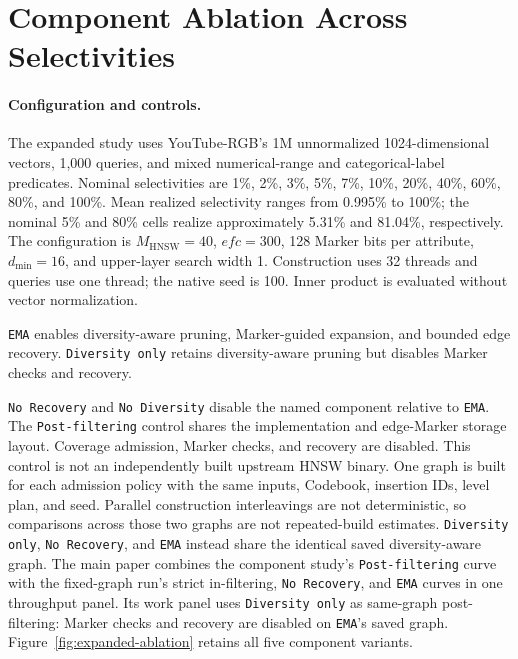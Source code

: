 \section{Component Ablation Across Selectivities}
\label{sec:component-ablation}


\paragraph{Configuration and controls.}
The expanded study uses YouTube-RGB's 1M unnormalized 1024-dimensional vectors, 1,000 queries, and mixed numerical-range and categorical-label predicates.
Nominal selectivities are 1\%, 2\%, 3\%, 5\%, 7\%, 10\%, 20\%, 40\%, 60\%, 80\%, and 100\%.
Mean realized selectivity ranges from 0.995\% to 100\%; the nominal 5\% and 80\% cells realize approximately 5.31\% and 81.04\%, respectively.
The configuration is $M_{\mathrm{HNSW}}=40$, $efc=300$, 128 Marker bits per attribute, $d_{\min}=16$, and upper-layer search width 1.
Construction uses 32 threads and queries use one thread; the native seed is 100.
Inner product is evaluated without vector normalization.

\texttt{EMA} enables diversity-aware pruning, Marker-guided expansion, and bounded edge recovery.
\texttt{Diversity only} retains diversity-aware pruning but disables Marker checks and recovery.

\texttt{No Recovery} and \texttt{No Diversity} disable the named component relative to \texttt{EMA}.
The \texttt{Post-filtering} control shares the implementation and edge-Marker storage layout.
Coverage admission, Marker checks, and recovery are disabled.
This control is not an independently built upstream HNSW binary.
One graph is built for each admission policy with the same inputs, Codebook, insertion IDs, level plan, and seed.
Parallel construction interleavings are not deterministic, so comparisons across those two graphs are not repeated-build estimates.
\texttt{Diversity only}, \texttt{No Recovery}, and \texttt{EMA} instead share the identical saved diversity-aware graph.
The main paper combines the component study's \texttt{Post-filtering} curve with the fixed-graph run's strict in-filtering, \texttt{No Recovery}, and \texttt{EMA} curves in one throughput panel.
Its work panel uses \texttt{Diversity only} as same-graph post-filtering: Marker checks and recovery are disabled on \texttt{EMA}'s saved graph.
Figure~\ref{fig:expanded-ablation} retains all five component variants.

